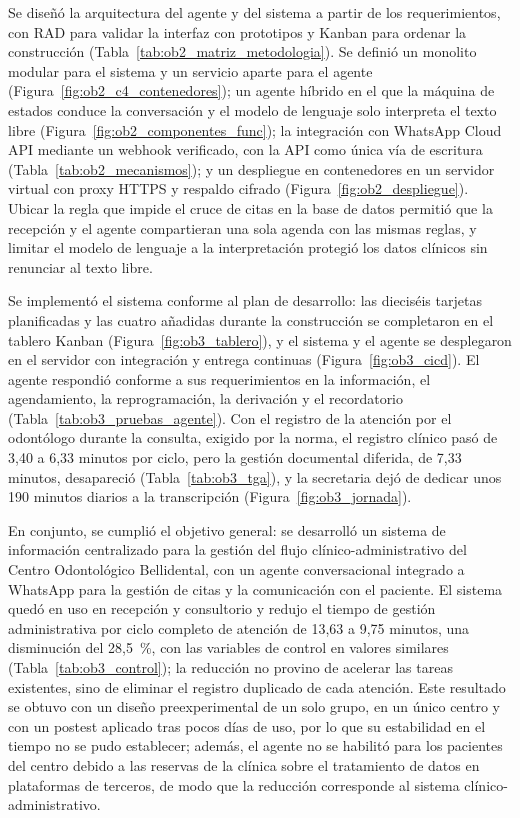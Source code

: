 Se diseñó la arquitectura del agente y del sistema a partir de los requerimientos, con RAD para validar la interfaz con prototipos y Kanban para ordenar la construcción (Tabla~\ref{tab:ob2_matriz_metodologia}). Se definió un monolito modular para el sistema y un servicio aparte para el agente (Figura~\ref{fig:ob2_c4_contenedores}); un agente híbrido en el que la máquina de estados conduce la conversación y el modelo de lenguaje solo interpreta el texto libre (Figura~\ref{fig:ob2_componentes_func}); la integración con WhatsApp Cloud API mediante un webhook verificado, con la API como única vía de escritura (Tabla~\ref{tab:ob2_mecanismos}); y un despliegue en contenedores en un servidor virtual con proxy HTTPS y respaldo cifrado (Figura~\ref{fig:ob2_despliegue}). Ubicar la regla que impide el cruce de citas en la base de datos permitió que la recepción y el agente compartieran una sola agenda con las mismas reglas, y limitar el modelo de lenguaje a la interpretación protegió los datos clínicos sin renunciar al texto libre.

Se implementó el sistema conforme al plan de desarrollo: las dieciséis tarjetas planificadas y las cuatro añadidas durante la construcción se completaron en el tablero Kanban (Figura~\ref{fig:ob3_tablero}), y el sistema y el agente se desplegaron en el servidor con integración y entrega continuas (Figura~\ref{fig:ob3_cicd}). El agente respondió conforme a sus requerimientos en la información, el agendamiento, la reprogramación, la derivación y el recordatorio (Tabla~\ref{tab:ob3_pruebas_agente}). Con el registro de la atención por el odontólogo durante la consulta, exigido por la norma, el registro clínico pasó de 3,40 a 6,33 minutos por ciclo, pero la gestión documental diferida, de 7,33 minutos, desapareció (Tabla~\ref{tab:ob3_tga}), y la secretaria dejó de dedicar unos 190 minutos diarios a la transcripción (Figura~\ref{fig:ob3_jornada}).

En conjunto, se cumplió el objetivo general: se desarrolló un sistema de información centralizado para la gestión del flujo clínico-administrativo del Centro Odontológico Bellidental, con un agente conversacional integrado a WhatsApp para la gestión de citas y la comunicación con el paciente. El sistema quedó en uso en recepción y consultorio y redujo el tiempo de gestión administrativa por ciclo completo de atención de 13,63 a 9,75 minutos, una disminución del 28,5~\%, con las variables de control en valores similares (Tabla~\ref{tab:ob3_control}); la reducción no provino de acelerar las tareas existentes, sino de eliminar el registro duplicado de cada atención. Este resultado se obtuvo con un diseño preexperimental de un solo grupo, en un único centro y con un postest aplicado tras pocos días de uso, por lo que su estabilidad en el tiempo no se pudo establecer; además, el agente no se habilitó para los pacientes del centro debido a las reservas de la clínica sobre el tratamiento de datos en plataformas de terceros, de modo que la reducción corresponde al sistema clínico-administrativo.

